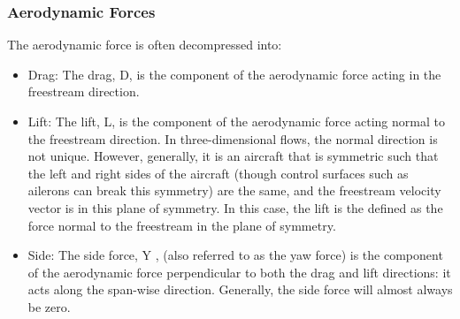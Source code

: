 \documentclass{article}
\begin{document}
    \subsubsection{Aerodynamic Forces}
        The aerodynamic force is often decompressed into:
        \begin{itemize}
            \item Drag: The drag, D, is the component of the aerodynamic force acting in the freestream direction.
            \item Lift: The lift, L, is the component of the aerodynamic force acting normal to the freestream direction. In three-dimensional flows, the normal direction is not unique. However, generally, it is an aircraft that is symmetric such that the left and right sides of the aircraft (though control surfaces such as ailerons can break this symmetry) are the same, and the freestream velocity vector is in this plane of symmetry. In this case, the lift is the defined as the force normal to the freestream in the plane of symmetry.
            \item Side: The side force, Y , (also referred to as the yaw force) is the component of the aerodynamic force perpendicular to both the drag and lift directions: it acts along the span-wise direction. Generally, the side force will almost always be zero.
        \end{itemize}
\end{document}
